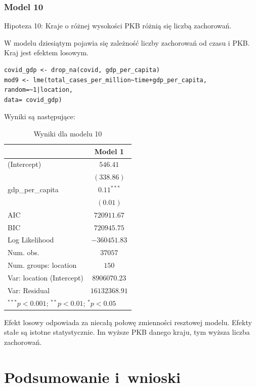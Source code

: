 \documentclass[12pt]{mwbk}
\theoremstyle{plain}
\theoremstyle{definition}
\theoremstyle{remark}
\begin{document}
\subsection{Model 10}

Hipoteza 10: Kraje o różnej wysokości PKB różnią się liczbą zachorowań.


W modelu dziesiątym pojawia się zależność liczby zachorowań od czasu i PKB. Kraj jest efektem losowym.

\begin{verbatim}
covid_gdp <- drop_na(covid, gdp_per_capita)
mod9 <- lme(total_cases_per_million~time+gdp_per_capita,
random=~1|location,
data= covid_gdp)
\end{verbatim}

Wyniki są następujące:
\begin{table}
	\begin{center}
		\begin{tabular}{l c}
			\hline
			& Model 1 \\
			\hline
			(Intercept)               & $546.41$      \\
			& $(338.86)$    \\
			gdp\_per\_capita          & $0.11^{***}$  \\
			& $(0.01)$      \\
			\hline
			AIC                       & $720911.67$   \\
			BIC                       & $720945.75$   \\
			Log Likelihood            & $-360451.83$  \\
			Num. obs.                 & $37057$       \\
			Num. groups: location     & $150$         \\
			Var: location (Intercept) & $8906070.23$  \\
			Var: Residual             & $16132368.91$ \\
			\hline
			\multicolumn{2}{l}{\scriptsize{$^{***}p<0.001$; $^{**}p<0.01$; $^{*}p<0.05$}}
		\end{tabular}
		\caption{Wyniki dla modelu 10}
		\label{table:model10}
	\end{center}
\end{table}

Efekt losowy odpowiada za niecałą połowę zmienności resztowej modelu. Efekty stałe są istotne statystycznie. Im wyższe PKB danego kraju, tym wyższa liczba zachorowań.
\chapter*{Podsumowanie i~wnioski}
\end{document}
